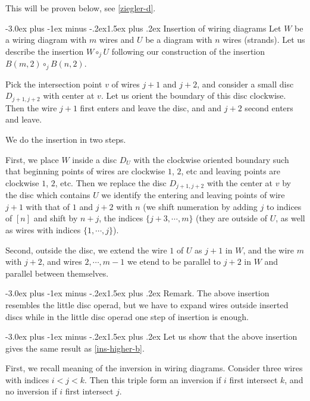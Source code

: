\documentclass[12pt,a4paper]{article}
\makeatletter
\renewcommand{\subsection}{\@startsection{subsection}{2}{0pt}%
{-3.0ex plus -1ex minus -.2ex}{-1.5ex plus .2ex}%
{\normalfont\large\bf}}
\renewcommand{\subsection}{\@startsection{subsection}{2}{0pt}%
{-3.0ex plus -1ex minus -.2ex}{1.5ex plus .2ex}%
{\normalfont\large\bf}}
\renewcommand{\subsection}{\@startsection{subsection}{2}{0pt}%
{-3.0ex plus -1ex minus -.2ex}{-1.5ex plus .2ex}%
{\normalfont\normalsize\bf}}
\renewcommand{\subsection}{\@startsection{subsection}{2}{0pt}%
{-3.0ex plus -1ex minus -.2ex}{1.5ex plus .2ex}%
{\normalfont\normalsize\bf}}
\makeatother
\begin{document}
 This will be proven below, see \ref{ziegler-d}.

\subsection{Insertion of wiring diagrams}
Let $W$ be a wiring diagram with $m$ wires and $U$ be a diagram with $n$ wires (strands). Let us describe the insertion $W\circ_j U$ following our construction of the insertion 
$B(m,2)\circ_{j} B(n,2)$.

Pick the intersection point $v$ of  wires $j+1$ and $j+2$, and consider a small disc $D_{j+1,j+2}$ with  center at $v$. Let us orient the boundary of this disc clockwise. Then the wire $j+1$ first enters and leave the disc, and and $j+2$ second enters and leave.

We do the insertion   in two steps.

First, we place $W$ inside a disc $D_U$ with the clockwise  oriented boundary such that beginning points of wires are clockwise $1$, $2$, etc and leaving points are clockwise $1$, $2$, etc.
Then we replace the disc $D_{j+1,j+2}$ with the center at $v$ by the disc which contains $U$ we identify the entering and leaving points of wire $j+1$ with that of $1$ and $j+2$ with $n$ (we shift numeration by adding $j$ to indices of $[n]$ and shift by $n+j$, the indices  $\{j+3, \cdots, m\}$ (they are outside of $U$, as well as wires with indices $\{1, \cdots, j\}$).

Second, outside the disc, we extend the wire $1$ of $ U$ as $j+1$ in $W$, and the wire $m$ with $j+2$, and wires $2, \cdots, m-1$ we etend to be parallel to $j+2$  in $W$ and parallel between themselves. 

\subsection{Remark.} The above insertion resembles the little disc operad, but we have to expand wires outside inserted discs while in the little disc operad one step of insertion is enough.

\subsection{}
Let us show that the above insertion gives the same result as \ref{ins-higher-b}.  

First, we recall meaning of the inversion in wiring diagrams. Consider three wires with indices $i<j<k$. Then this triple form an inversion if $i$ first intersect $k$, and no inversion if $i$ first intersect $j$.
\end{document}
